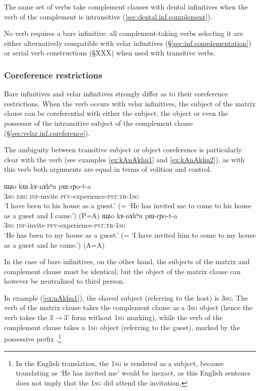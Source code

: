 The same set of verbs take complement clauses with dental infinitives when the verb of the complement is intransitive (\ref{sec:dental.inf.complement}).

No verb requires a bare infinitive: all complement-taking verbs selecting it are either alternatively compatible with velar infinitives (§\ref{sec:inf.complementation}) or serial verb constructions (§XXX) when used with transitive verbs.


\subsubsection{Coreference restrictions} \label{sec:bare.inf.coreference}
Bare infinitives and velar infinitives strongly differ as to their coreference restrictions. When the verb  occurs with velar infinitives, the subject of the matrix clause can be coreferential with either the subject, the object or even the possessor of the intransitive subject of the complement clause (§\ref{sec:velar.inf.coreference}).

The ambiguity between transitive subject or object coreference is particularly clear with the verb  (see examples \ref{ex:kAnAkhu1} and \ref{ex:kAnAkhu2}), as with this verb both arguments are equal in terms of volition and control.

\begin{exe}
\ex  \label{ex:kAnAkhu1}
\gll ɯʑo kɯ kɤ-nɤkʰu pɯ-rɲo-t-a  \\
\textsc{3sg} \textsc{erg} \textsc{inf}-invite \textsc{pfv}-experience-\textsc{pst:tr-1sg} \\
\glt `I have been to his house as a guest.'  (= `He has invited me to come to his house as a guest and I came.') (P=A)
\ex  \label{ex:kAnAkhu2}
\gll ɯʑo kɤ-nɤkʰu pɯ-rɲo-t-a  \\
\textsc{3sg}  \textsc{inf}-invite \textsc{pfv}-experience-\textsc{pst:tr-1sg} \\
\glt `He has been to my house as a guest.' (= `I have invited him to come to my house as a guest and he came.') (A=A)
\end{exe}

In the case of bare infinitives, on the other hand, the subjects of the matrix and complement clause must be identical, but the object of the matrix clause can however be neutralized to third person.

In example (\ref{ex:nAkhu1}), the shared subject (referring to the host) is \textsc{3sg}. The verb of the matrix clause takes the complement clause as a \textsc{3sg} object (hence the verb takes the 3$\rightarrow$3' form without \textsc{1sg} marking), while the verb of the complement clause takes a \textsc{1sg} object (referring to the guest), marked by the possessive prefix .\footnote{In the English translation, the \textsc{1sg} is rendered as a subject, because translating   as `He has invited me' would be inexact, as this English sentence does not imply that the \textsc{1sg} did attend the invitation. }

